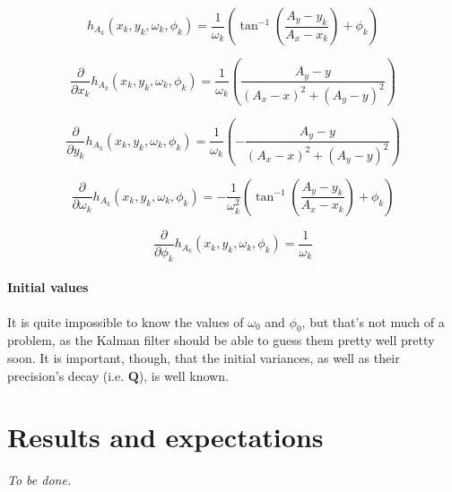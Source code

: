 \documentclass[a4paper, 12pt]{paper}
\begin{document}
\begin{equation}
    h_{A_k}\left(x_k, y_k, \omega_k, \phi_k\right)
        = \frac{1}{\omega_k}\left(\tan^{-1}\left(\frac{A_y-y_k}{A_x-x_k}\right)
            + \phi_k \right)
    \label{eq:h_a}
\end{equation}

\begin{equation}
    \frac{\partial}{\partial x_k}h_{A_k}\left(x_k, y_k, \omega_k, \phi_k\right)
        = \frac{1}{\omega_k}\left(
        \frac{A_y-y}{{\left(A_x-x\right)}^2+{\left(A_y-y\right)}^2}\right)
    \label{eq:partial_x_2}
\end{equation}

\begin{equation}
    \frac{\partial}{\partial y_k}h_{A_k}\left(x_k, y_k, \omega_k, \phi_k\right)
        = \frac{1}{\omega_k}\left(
        - \frac{A_y-y}{{\left(A_x-x\right)}^2+{\left(A_y-y\right)}^2}\right)
    \label{eq:partial_y_2}
\end{equation}

\begin{equation}
    \frac{\partial}{\partial \omega_k}h_{A_k}
    \left(x_k, y_k, \omega_k, \phi_k\right)
    = - \frac{1}{\omega_k^2}\left(\tan^{-1}\left(\frac{A_y-y_k}{A_x-x_k}\right)
      + \phi_k \right)
    \label{eq:partial_omega_2}
\end{equation}

\begin{equation}
    \frac{\partial}{\partial \phi_k}h_{A_k}
    \left(x_k, y_k, \omega_k, \phi_k\right)
    = \frac{1}{\omega_k}
    \label{eq:partial_phi}
\end{equation}

\paragraph{Initial values}

It is quite impossible to know the values of $\omega_0$ and $\phi_0$, but
that's not much of a problem, as the Kalman filter should be able to guess
them pretty well pretty soon. It is important, though, that the initial
variances, as well as their precision's decay (i.e. $\mathbf{Q}$), is well
known.


\section{Results and expectations}

\emph{To be done.}




\end{document}
